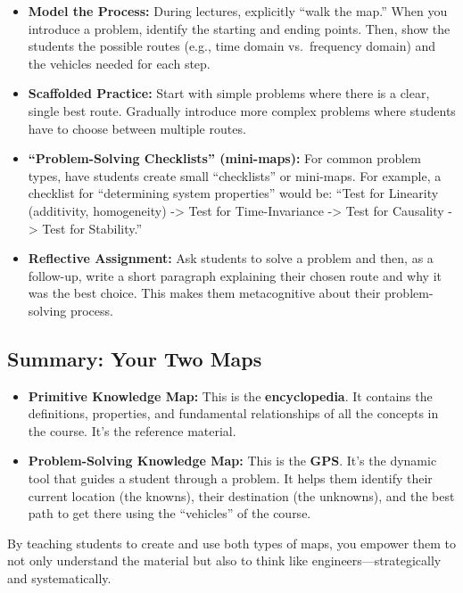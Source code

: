 \documentclass[
  letterpaper,
  DIV=11,
  numbers=noendperiod]{scrreprt}
\begin{document}
\begin{itemize}
\item
  \textbf{Model the Process:} During lectures, explicitly ``walk the
  map.'' When you introduce a problem, identify the starting and ending
  points. Then, show the students the possible routes (e.g., time domain
  vs.~frequency domain) and the vehicles needed for each step.
\item
  \textbf{Scaffolded Practice:} Start with simple problems where there
  is a clear, single best route. Gradually introduce more complex
  problems where students have to choose between multiple routes.
\item
  \textbf{``Problem-Solving Checklists'' (mini-maps):} For common
  problem types, have students create small ``checklists'' or mini-maps.
  For example, a checklist for ``determining system properties'' would
  be: ``Test for Linearity (additivity, homogeneity) -\textgreater{}
  Test for Time-Invariance -\textgreater{} Test for Causality
  -\textgreater{} Test for Stability.''
\item
  \textbf{Reflective Assignment:} Ask students to solve a problem and
  then, as a follow-up, write a short paragraph explaining their chosen
  route and why it was the best choice. This makes them metacognitive
  about their problem-solving process.
\end{itemize}

\subsection{Summary: Your Two Maps}\label{summary-your-two-maps}

\begin{itemize}
\item
  \textbf{Primitive Knowledge Map:} This is the \textbf{encyclopedia}.
  It contains the definitions, properties, and fundamental relationships
  of all the concepts in the course. It's the reference material.
\item
  \textbf{Problem-Solving Knowledge Map:} This is the \textbf{GPS}. It's
  the dynamic tool that guides a student through a problem. It helps
  them identify their current location (the knowns), their destination
  (the unknowns), and the best path to get there using the ``vehicles''
  of the course.
\end{itemize}

By teaching students to create and use both types of maps, you empower
them to not only understand the material but also to think like
engineers---strategically and systematically.
\end{document}
